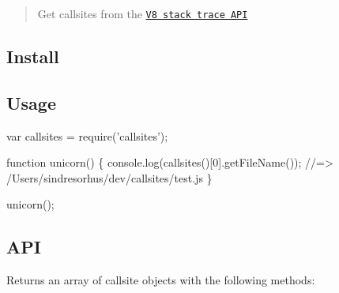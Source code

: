 \begin{quote}
Get callsites from the \href{https://code.google.com/p/v8/wiki/JavaScriptStackTraceApi}{\tt V8 stack trace A\+PI} \end{quote}


\subsection*{Install}




\subsection*{Usage}


\begin{DoxyCode}
var callsites = require('callsites');

function unicorn() \{
    console.log(callsites()[0].getFileName());
    //=> /Users/sindresorhus/dev/callsites/test.js
\}

unicorn();
\end{DoxyCode}


\subsection*{A\+PI}

Returns an array of callsite objects with the following methods\+:


